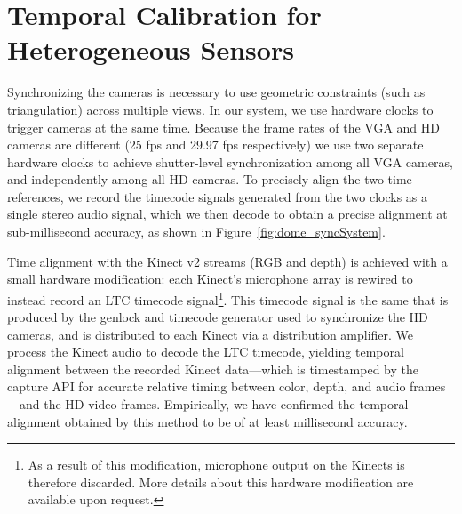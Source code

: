 \section{Temporal Calibration for Heterogeneous Sensors}
Synchronizing the cameras is necessary to use geometric constraints (such as triangulation) across multiple views. In our system, we use hardware clocks to trigger cameras at the same time. Because the frame rates of the VGA and HD cameras are different (25 fps and 29.97 fps respectively) we use two separate hardware clocks to achieve shutter-level synchronization among all VGA cameras, and independently among all HD cameras. To precisely align the two time references, we record the timecode signals generated from the two clocks as a single stereo audio signal, which we then decode to obtain a precise alignment at sub-millisecond accuracy, as shown in Figure~\ref{fig:dome_syncSystem}.

Time alignment with the Kinect v2 streams (RGB and depth) is achieved with a small hardware modification: each Kinect's microphone array is rewired to instead record an LTC timecode signal\footnote{As a result of this modification, microphone output on the Kinects is therefore discarded. More details about this hardware modification are available upon request.}.  This timecode signal is the same that is produced by the genlock and timecode generator used to synchronize the HD cameras, and is distributed to each Kinect via a distribution amplifier. We process the Kinect audio to decode the LTC timecode, yielding temporal alignment between the recorded Kinect data---which is timestamped by the capture API for accurate relative timing between color, depth, and audio frames---and the HD video frames. Empirically, we have confirmed the temporal alignment obtained by this method to be of at least millisecond accuracy.


